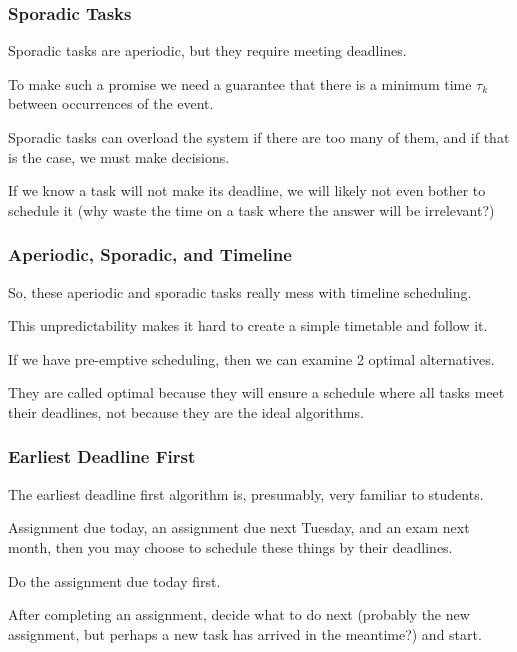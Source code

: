 \begin{frame}
\frametitle{Sporadic Tasks}

Sporadic tasks are aperiodic, but they require meeting deadlines. 

To make such a promise we need a guarantee that there is a minimum time $\tau_{k}$ between occurrences of the event. 

Sporadic tasks can overload the system if there are too many of them, and if that is the case, we must make decisions. 

If we know a task will not make its deadline, we will likely not even bother to schedule it (why waste the time on a task where the answer will be irrelevant?)


\end{frame}

\begin{frame}
\frametitle{Aperiodic, Sporadic, and Timeline}

So, these aperiodic and sporadic tasks really mess with timeline scheduling. 

This unpredictability makes it hard to create a simple timetable and follow it.

If we have pre-emptive scheduling, then we can examine 2 optimal alternatives. 

They are called optimal because they will ensure a schedule where all tasks meet their deadlines, not because they are the ideal algorithms.



\end{frame}

\begin{frame}
\frametitle{Earliest Deadline First}

The earliest deadline first algorithm is, presumably, very familiar to students. 

Assignment due today, an assignment due next Tuesday, and an exam next month, then you may choose to schedule these things by their deadlines. 

Do the assignment due today first. 

After completing an assignment, decide what to do next (probably the new assignment, but perhaps a new task has arrived in the meantime?) and start.


\end{frame}

